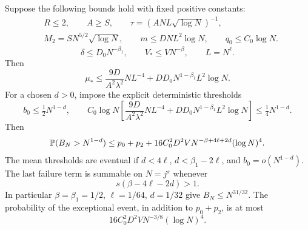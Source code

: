 \begin{corollary}\label{cor:T3-powers}
Suppose the following bounds hold with fixed positive constants:
\begin{align*}
 &R\leq2,\qquad A\geq S,\qquad \tau=(ANL\sqrt{\log N})^{-1},\\
 &M_2=SN^{5/2}\sqrt{\log N},\qquad
 m\leq DNL^2\log N,\qquad q_0\leq C_0\log N.
\end{align*}
\[
 \delta\leq D_0N^{-\beta_1},\qquad
 V_*\leq VN^{-\beta},\qquad L=N^\ell.
\]
Then
\begin{equation}
 \mu_*\leq\frac{9D}{A^2\lambda^2}NL^{-4}
           +DD_0N^{1-\beta_1}L^2\log N. \label{eq:T3-mean}
\end{equation}
For a chosen $d>0$, impose the explicit deterministic thresholds
\[
 b_0\leq\tfrac12N^{1-d},\qquad
 C_0\log N\left[\frac{9D}{A^2\lambda^2}NL^{-4}
           +DD_0N^{1-\beta_1}L^2\log N\right]
       \leq\tfrac14N^{1-d}.
\]
Then
\begin{equation}
 \mathbb P(B_N>N^{1-d})
 \leq p_0+p_2+16C_0^2D^2V
         N^{-\beta+4\ell+2d}(\log N)^4. \label{eq:T3-power}
\end{equation}
The mean thresholds are eventual if
$d<4\ell$, $d<\beta_1-2\ell$, and $b_0=o(N^{1-d})$.
The last failure term is summable on $N=j^s$ whenever
\[
 s(\beta-4\ell-2d)>1.
\]
In particular $\beta=\beta_1=1/2$, $\ell=1/64$, $d=1/32$
give $B_N\leq N^{31/32}$.  The probability of the exceptional event, in
addition to $p_0+p_2$, is at most
\[
 16C_0^2D^2VN^{-3/8}(\log N)^4.
\]
\end{corollary}

